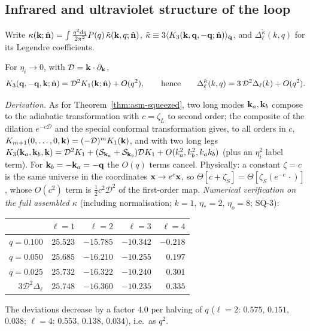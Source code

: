 \subsection{Infrared and ultraviolet structure of the loop}
\label{sec:asm-IR}
Write $\kappa(\mathbf k;\hat{\mathbf n})=\int\frac{q^2\mathrm d q}{2\pi^2}P(q)\,\tilde\kappa(\mathbf k,q;\hat{\mathbf n})$, $\tilde\kappa\equiv3\langle K_3(\mathbf k,\mathbf q,-\mathbf q;\hat{\mathbf n})\rangle_{\hat{\mathbf q}}$, and
$\Delta^{\tilde\kappa}_\ell(k,q)$ for its Legendre coefficients.
\begin{theorem}\label{thm:asm-squeezed3}
For $\eta_i\to0$, with $\mathcal D=\mathbf k\cdot\partial_\mathbf k$,
\begin{equation}
K_3(\mathbf q,-\mathbf q,\mathbf k;\hat{\mathbf n})=\mathcal D^2K_1(\mathbf k;\hat{\mathbf n})+O(q^2),\qquad\text{hence}\qquad \Delta^{\tilde\kappa}_\ell(k,q)=3\,\mathcal D^2\Delta_\ell(k)+O(q^2).
\label{eq:asm-squeezed3}
\end{equation}
\end{theorem}
\noindent\emph{Derivation.}  As for Theorem~\ref{thm:asm-squeezed}, two long modes $\mathbf k_a,\mathbf k_b$ compose to the adiabatic transformation with
$c=\zeta_L$ to second order; the composite of the dilation $e^{-c\mathcal D}$ and the special conformal transformation gives, to all orders in
$c$, $K_{m+1}(0,\dots,0,\mathbf k)=(-\mathcal D)^mK_1(\mathbf k)$, and with two long legs
$K_3(\mathbf k_a,\mathbf k_b,\mathbf k)=\mathcal D^2K_1+(\mathcal S_{\mathbf k_a}+\mathcal S_{\mathbf k_b})\mathcal DK_1+O(k_a^2,k_b^2,k_ak_b)$ (plus an $\eta_i^2$ label term).  For
$\mathbf k_b=-\mathbf k_a=-\mathbf q$ the $O(q)$ terms cancel.  Physically: a constant $\zeta=c$ is the same universe in the coordinates $\mathbf x\to e^c\mathbf x$, so
$\Theta[c+\zeta_S]=\Theta[\zeta_S(e^{-c}\,\cdot)]$, whose $O(c^2)$ term is $\tfrac12c^2\mathcal D^2$ of the first-order map.
\emph{Numerical verification on the full assembled $\kappa$} (including normalisation; $k=1$, $\eta_*=2$, $\eta_o=8$; SQ-3):
\begin{center}\footnotesize
\begin{tabular}{r|rrrr}
\hline
& $\ell=1$ & $\ell=2$ & $\ell=3$ & $\ell=4$\\ \hline
$q=0.100$ & $25.523$ & $-15.785$ & $-10.342$ & $-0.218$\\
$q=0.050$ & $25.685$ & $-16.210$ & $-10.255$ & $0.197$\\
$q=0.025$ & $25.732$ & $-16.322$ & $-10.240$ & $0.301$\\ \hline
$3\mathcal D^2\Delta_\ell$ & $25.748$ & $-16.360$ & $-10.235$ & $0.335$\\ \hline
\end{tabular}
\end{center}
The deviations decrease by a factor $4.0$ per halving of $q$ ($\ell=2$: $0.575$, $0.151$, $0.038$; $\ell=4$: $0.553$, $0.138$, $0.034$), i.e.\ as $q^2$.

